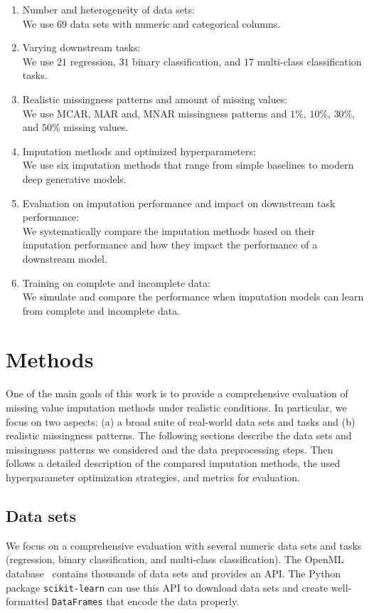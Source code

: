 \documentclass[utf8]{frontiersSCNS} %
\newcommand{\code}[1]{\texttt{#1}}
\begin{document}
\begin{enumerate}
	\item Number and heterogeneity of data sets:\\
	We use $69$ data sets with numeric and categorical columns.

	\item Varying downstream tasks:\\
	We use $21$ regression, $31$ binary classification, and $17$ multi-class classification tasks.

	\item Realistic missingness patterns and amount of missing values:\\
	We use MCAR, MAR and, MNAR missingness patterns and $1\%$, $10\%$, $30\%$, and $50\%$ missing values.

	\item Imputation methods and optimized hyperparameters:\\
	We use six imputation methods that range from simple baselines to modern deep generative models.

	\item Evaluation on imputation performance and impact on downstream task performance:\\
	We systematically compare the imputation methods based on their imputation performance and how they impact the performance of a downstream model.

	\item Training on complete and incomplete data:\\
	We simulate and compare the performance when imputation models can learn from complete and incomplete data.
\end{enumerate}


\section{Methods}
\label{sec:methods}
%
One of the main goals of this work is to provide a comprehensive evaluation of missing value imputation methods under realistic conditions. In particular, we focus on two aspects: (a) a broad suite of real-world data sets and tasks and (b) realistic missingness patterns. The following sections describe the data sets and missingness patterns we considered and the data preprocessing steps. Then follows a detailed description of the compared imputation methods, the used hyperparameter optimization strategies, and metrics for evaluation.

\subsection{Data sets}
\label{sec:datasets}
%
We focus on a comprehensive evaluation with several numeric data sets and tasks (regression, binary classification, and multi-class classification). The OpenML database~\citep{OpenML2013} contains thousands of data sets and provides an API. The Python package \code{scikit-learn} \citep{scikit-learn} can use this API to download data sets and create well-formatted \code{DataFrames} that encode the data properly.
\end{document}
